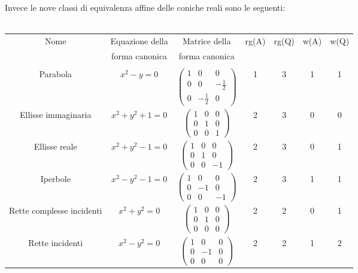  \vspace{5mm}
 Invece le nove classi di equivalenza affine delle coniche reali sono le seguenti:\\
  \vspace{0mm}\\
 \begin{tabular}{|c|c|c|c|c|c|c|}
  \hline
  Nome & Equazione della & Matrice della & rg(A) & rg(Q) & w(A) & w(Q)\\
   &  forma canonica & forma canonica & & & & \\
  \hline
  & & & & & & \\
  Parabola&$x^2-y=0$& $\left(\begin{smallmatrix}1 & 0 & 0 \\ 0 & 0 &-\frac{1}{2}\\ 0 &-\frac{1}{2} & 0\end{smallmatrix}\right)$& 1 & 3 & 1 &1\\
  Ellisse immaginaria&$x^2+y^2+1=0$&$\left(\begin{smallmatrix} 1 & 0 & 0 \\ 0 & 1 & 0 \\ 0 & 0 & 1 \end{smallmatrix}\right)$&2&3&0&0\\
  Ellisse reale&$x^2+y^2-1=0$&$\left(\begin{smallmatrix} 1 & 0 & 0 \\ 0 & 1 & 0 \\ 0 & 0 & -1 \end{smallmatrix}\right)$&2&3&0&1\\
  Iperbole&$x^2-y^2-1=0$&$\left(\begin{smallmatrix} 1 & 0 & 0 \\ 0 & -1 & 0 \\ 0 & 0 & -1 \end{smallmatrix}\right)$&2&3&1&1\\
  Rette complesse incidenti&$x^2+y^2=0$&$\left(\begin{smallmatrix} 1 & 0 & 0 \\ 0 & 1 & 0 \\ 0 & 0 & 0 \end{smallmatrix}\right)$&2&2&0&1\\
  Rette incidenti&$x^2-y^2=0$&$\left(\begin{smallmatrix} 1 & 0 & 0 \\ 0 & -1 & 0 \\ 0 & 0 & 0 \end{smallmatrix}\right)$&2&2&1&2\\

\end{tabular}
